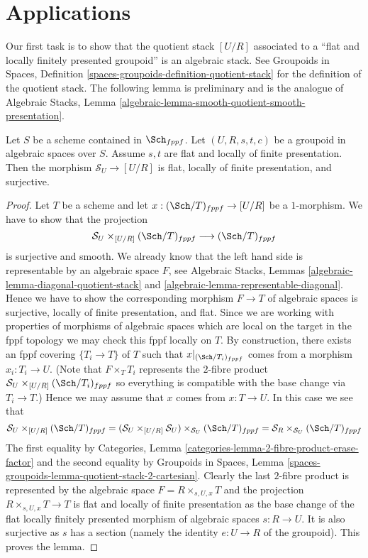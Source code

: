 \section{Applications}
\label{section-applications}

\noindent
Our first task is to show that the quotient stack $[U/R]$ associated to
a ``flat and locally finitely presented groupoid'' is an algebraic stack.
See
Groupoids in Spaces,
Definition \ref{spaces-groupoids-definition-quotient-stack}
for the definition of the quotient stack.
The following lemma is preliminary and is the analogue of
Algebraic Stacks,
Lemma \ref{algebraic-lemma-smooth-quotient-smooth-presentation}.

\begin{lemma}
\label{lemma-flat-quotient-flat-presentation}
Let $S$ be a scheme contained in $\Sch_{fppf}$.
Let $(U, R, s, t, c)$ be a groupoid in algebraic spaces over $S$.
Assume $s, t$ are flat and locally of finite presentation.
Then the morphism $\mathcal{S}_U \to [U/R]$ is flat, locally of
finite presentation, and surjective.
\end{lemma}

\begin{proof}
Let $T$ be a scheme and let $x : (\Sch/T)_{fppf} \to [U/R]$
be a $1$-morphism. We have to show that the projection
$$
\mathcal{S}_U \times_{[U/R]} (\Sch/T)_{fppf}
\longrightarrow
(\Sch/T)_{fppf}
$$
is surjective and smooth. We already know that the left hand side
is representable by an algebraic space $F$, see
Algebraic Stacks, Lemmas \ref{algebraic-lemma-diagonal-quotient-stack} and
\ref{algebraic-lemma-representable-diagonal}.
Hence we have to show the corresponding morphism $F \to T$ of
algebraic spaces is surjective, locally of finite presentation, and flat.
Since we are working with properties of morphisms of algebraic
spaces which are local on the target in the fppf topology we
may check this fppf locally on $T$. By construction, there exists
an fppf covering $\{T_i \to T\}$ of $T$ such that
$x|_{(\Sch/T_i)_{fppf}}$ comes from a morphism
$x_i : T_i \to U$. (Note that $F \times_T T_i$ represents the
$2$-fibre product $\mathcal{S}_U \times_{[U/R]} (\Sch/T_i)_{fppf}$
so everything is compatible with the base change via $T_i \to T$.)
Hence we may assume that $x$ comes from $x : T \to U$.
In this case we see that
$$
\mathcal{S}_U \times_{[U/R]} (\Sch/T)_{fppf}
=
(\mathcal{S}_U \times_{[U/R]} \mathcal{S}_U)
\times_{\mathcal{S}_U} (\Sch/T)_{fppf}
=
\mathcal{S}_R \times_{\mathcal{S}_U} (\Sch/T)_{fppf}
$$
The first equality by
Categories, Lemma \ref{categories-lemma-2-fibre-product-erase-factor}
and the second equality by
Groupoids in Spaces,
Lemma \ref{spaces-groupoids-lemma-quotient-stack-2-cartesian}.
Clearly the last $2$-fibre product is represented by the algebraic
space $F = R \times_{s, U, x} T$ and the projection
$R \times_{s, U, x} T \to T$ is flat and locally of finite presentation
as the base change of the flat locally finitely presented
morphism of algebraic spaces $s : R \to U$.
It is also surjective as $s$ has a section (namely the identity
$e : U \to R$ of the groupoid).
This proves the lemma.
\end{proof}

